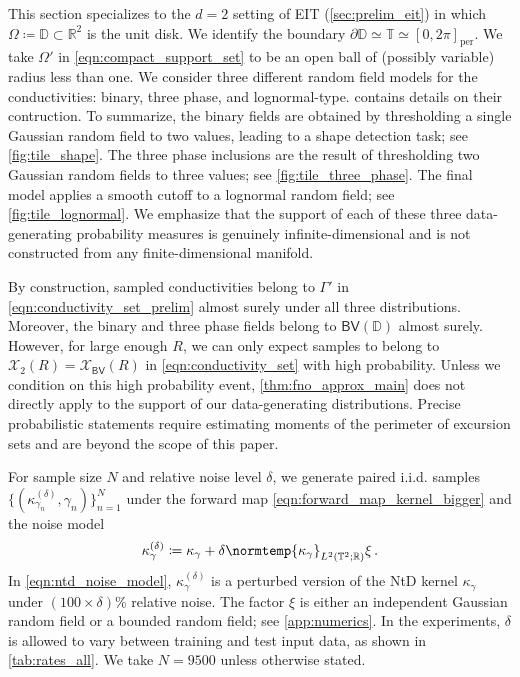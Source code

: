 \documentclass[pdflatex,sn-mathphys-num]{sn-jnl-preprint}
\newcommand{\R}{\mathbb{R}}
\newcommand{\T}{\mathbb{T}}
\newcommand{\D}{\mathbb{D}}
\newcommand{\cX}{\mathcal{X}}
\newcommand{\BV}{\mathsf{BV}}
\newcommand{\norm}{\normtemp}
\newcommand{\defeq}{\coloneqq} %
\theoremstyle{thmstyleone}%
\theoremstyle{thmstyletwo}%
\theoremstyle{thmstylethree}%
\numberwithin{equation}{section}
\numberwithin{theorem}{section}
\begin{document}
This section specializes to the $d=2$ setting of EIT (\cref{sec:prelim_eit}) in which $\Omega\defeq\mathbb{D}\subset\R^2$ is the unit disk. We identify the boundary $\partial\D\simeq\T\simeq [0,2\pi]_{\mathrm{per}}$. We take $\Omega'$ in \eqref{eqn:compact_support_set} to be an open ball of (possibly variable) radius less than one.
We consider three different random field models for the conductivities: binary, three phase, and lognormal-type.  contains details on their contruction. To summarize, the binary fields are obtained by thresholding a single Gaussian random field to two values, leading to a shape detection task; see \cref{fig:tile_shape}. The three phase inclusions are the result of thresholding two Gaussian random fields to three values; see \cref{fig:tile_three_phase}. The final model applies a smooth cutoff to a lognormal random field; see \cref{fig:tile_lognormal}.
We emphasize that the support of each of these three data-generating probability measures is genuinely infinite-dimensional and is not constructed from any finite-dimensional manifold. 

By construction, sampled conductivities belong to $\Gamma'$ in \eqref{eqn:conductivity_set_prelim} almost surely under all three distributions. Moreover, the binary and three phase fields belong to $\BV(\D)$ almost surely. However, for large enough $R$, we can only expect samples to belong to $\cX_2(R)=\cX_{\BV}(R)$ in \eqref{eqn:conductivity_set} with high probability. Unless we condition on this high probability event, \cref{thm:fno_approx_main} does not directly apply to the support of our data-generating distributions. Precise probabilistic statements require estimating moments of the perimeter of excursion sets \cite{adler2007random} and are beyond the scope of this paper.

For sample size $N$ and relative noise level $\delta$, we generate paired i.i.d. samples $\{(\kappa_{\gamma_n}^{(\delta)},\gamma_n)\}_{n=1}^N$ under the forward map \eqref{eqn:forward_map_kernel_bigger} and the noise model
\begin{align}\label{eqn:ntd_noise_model}
    \kappa_\gamma^{(\delta)}\defeq \kappa_\gamma + \delta\norm{\kappa_\gamma}_{L^2(\T^2;\R)}\xi\,.
\end{align}
In \eqref{eqn:ntd_noise_model}, $\kappa_\gamma^{(\delta)}$ is a perturbed version of the NtD kernel $\kappa_\gamma$ under $(100\times \delta)\%$ relative noise. The factor $\xi$ is either an independent Gaussian random field or a bounded random field; see \cref{app:numerics}. 
In the experiments, $\delta$ is allowed to vary between training and test input data, as shown in \cref{tab:rates_all}. We take $N=9500$ unless otherwise stated.
\end{document}
